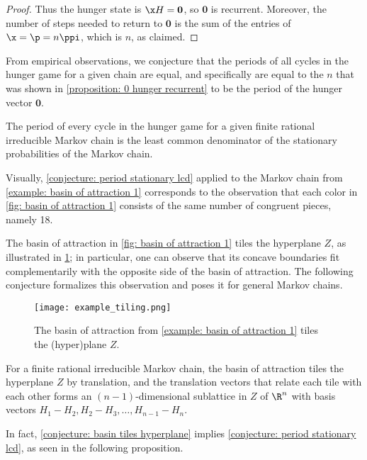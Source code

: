\begin{proof}
Thus the hunger state is $\x H=\mathbf{0}$, so $\mathbf{0}$ is recurrent.
Moreover, the number of steps needed to return to $\mathbf{0}$ 
is the sum of the entries of $\x=\p=n\ppi$, which is $n$, as claimed.
\end{proof}

From empirical observations, we conjecture that 
the periods of all cycles in the hunger game for a given chain are equal, 
and specifically are equal to the $n$ 
that was shown in \cref{proposition: 0 hunger recurrent}
to be the period of the hunger vector $\mathbf{0}$.

\begin{conjecture}\label{conjecture: period stationary lcd}
The period of every cycle in the hunger game 
for a given finite rational irreducible Markov chain 
is the least common denominator of the stationary probabilities of the Markov chain.
\end{conjecture}

Visually, \cref{conjecture: period stationary lcd} 
applied to the Markov chain from \cref{example: basin of attraction 1} 
corresponds to the observation that each color in \cref{fig: basin of attraction 1} 
consists of the same number of congruent pieces, namely 18.

The basin of attraction in \cref{fig: basin of attraction 1} tiles the hyperplane $Z$, as illustrated in \cref{fig: basin tiling}; 
in particular, one can observe that its concave boundaries fit complementarily 
with the opposite side of the basin of attraction.
The following conjecture formalizes this observation 
and poses it for general Markov chains.
\begin{figure}[htbp]
    \centering
    \texttt{[image: example\_tiling.png]}
    \caption{The basin of attraction from \cref{example: basin of attraction 1} tiles the (hyper)plane $Z$.}
    \label{fig: basin tiling}
\end{figure}

\begin{conjecture}\label{conjecture: basin tiles hyperplane}
For a finite rational irreducible Markov chain, 
the basin of attraction tiles the hyperplane $Z$ by translation, 
and the translation vectors that relate each tile with each other 
forms an $(n-1)$-dimensional sublattice in $Z$ of $\R^n$ 
with basis vectors $H_1-H_2,H_2-H_3,\dots,H_{n-1}-H_n$.
\end{conjecture}

In fact, \cref{conjecture: basin tiles hyperplane} 
implies \cref{conjecture: period stationary lcd}, as seen in the following proposition.

